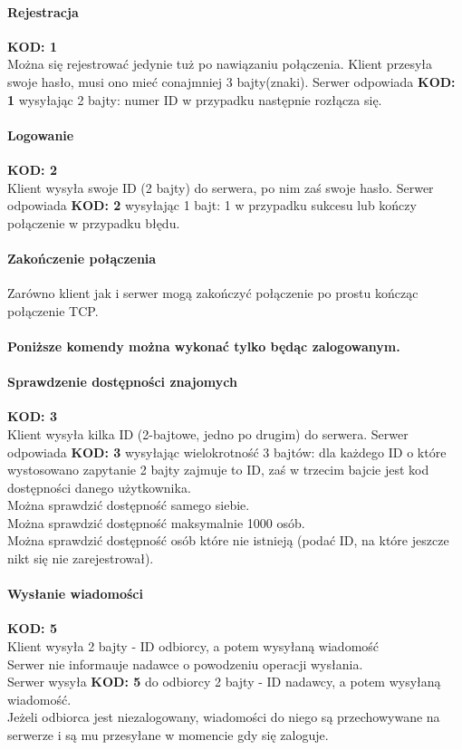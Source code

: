 \documentclass[10pt,a4paper]{article}
\newcommand{\kod}[1]{\textbf{\small{KOD: #1}}}
\begin{document}
	\paragraph{Rejestracja}\kod{1}\\
		Można się rejestrować jedynie tuż po nawiązaniu połączenia.
		Klient przesyła swoje hasło, musi ono mieć conajmniej 3 bajty(znaki).
		Serwer odpowiada \kod{1} wysyłając 2 bajty: numer ID w przypadku następnie rozłącza się.
	\paragraph{Logowanie}\kod{2}\\
		Klient wysyła swoje ID (2 bajty) do serwera, po nim zaś swoje hasło.
		Serwer odpowiada \kod{2} wysyłając 1 bajt: 1 w przypadku sukcesu lub kończy połączenie w przypadku błędu.
	\paragraph{Zakończenie połączenia} Zarówno klient jak i serwer mogą zakończyć połączenie po prostu
		kończąc połączenie TCP.
	
	\paragraph{} \textbf{Poniższe komendy można wykonać tylko będąc zalogowanym.}
	\paragraph{Sprawdzenie dostępności znajomych}\kod{3}\\
		Klient wysyła kilka ID (2-bajtowe, jedno po drugim) do serwera.
		Serwer odpowiada \kod{3} wysyłając wielokrotność 3 bajtów: dla każdego ID o które wystosowano zapytanie
		2 bajty zajmuje to ID, zaś w trzecim bajcie jest kod dostępności danego użytkownika.\\
		Można sprawdzić dostępność samego siebie.\\
		Można sprawdzić dostępność maksymalnie 1000 osób.\\		
		Można sprawdzić dostępność osób które nie istnieją (podać ID, na które jeszcze nikt się nie zarejestrował).
	\paragraph{Wysłanie wiadomości}\kod{5}\\
		Klient wysyła 2 bajty - ID odbiorcy, a potem wysyłaną wiadomość\\
		Serwer nie informauje nadawce o powodzeniu operacji wysłania.\\
		Serwer wysyła \kod{5} do odbiorcy 2 bajty - ID nadawcy, a potem wysyłaną wiadomość.\\
		Jeżeli odbiorca jest niezalogowany, wiadomości do niego są przechowywane na serwerze
		i są mu przesyłane w momencie gdy się zaloguje.
		
\end{document}

